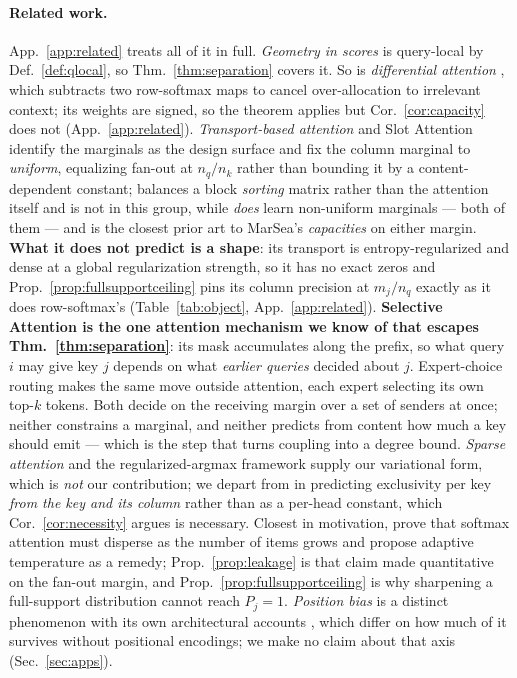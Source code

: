\documentclass{article}
\begin{document}
\paragraph{Related work.} App.~\ref{app:related} treats all of it in full. \emph{Geometry in
scores} \citep{hu2018relation,wu2021rethinking,gao2021fast,liu2022dab,hou2024relation} is
query-local by Def.~\ref{def:qlocal}, so Thm.~\ref{thm:separation} covers it. So is
\emph{differential attention} \citep{ye2024differential}, which subtracts two row-softmax maps to
cancel over-allocation to irrelevant context; its weights are signed, so the theorem applies but
Cor.~\ref{cor:capacity} does not (App.~\ref{app:related}).
\emph{Transport-based attention}
\citep{sander2022sinkformers,shahbazi2025lotformer} and Slot Attention
\citep{locatello2020slot} identify the marginals as the design surface and fix the column
marginal to \emph{uniform}, equalizing fan-out at $n_q/n_k$ rather than bounding it by a
content-dependent constant; \citet{tay2020sparse} balances a block \emph{sorting} matrix rather
than the attention itself and is not in this group, while \citet{zhang2023mesh} \emph{does}
learn non-uniform marginals --- both of them --- and is the closest prior art to MarSea's
\emph{capacities} on either margin. \textbf{What it does not predict is a shape}: its transport
is entropy-regularized and dense at a global regularization strength, so it has no exact zeros
and Prop.~\ref{prop:fullsupportceiling} pins its column precision at $m_j/n_q$ exactly as it does
row-softmax's (Table~\ref{tab:object}, App.~\ref{app:related}). \textbf{Selective Attention \citep{leviathan2024selective} is the one attention mechanism we know
of that escapes Thm.~\ref{thm:separation}}: its mask accumulates along the prefix, so what query
$i$ may give key $j$ depends on what \emph{earlier queries} decided about $j$. Expert-choice
routing \citep{zhou2022mixture} makes the same move outside attention, each expert selecting its
own top-$k$ tokens. Both decide on the receiving margin over a set of senders at once; neither
constrains a marginal, and neither predicts from content how much a key should emit --- which is
the step that turns coupling into a degree bound.
\emph{Sparse attention} \citep{martins2016softmax,peters2019sparse,correia2019adaptively} and the
regularized-argmax framework \citep{niculae2017regularized,blondel2019fenchel} supply our
variational form, which is \emph{not} our contribution; we depart from
\citet{correia2019adaptively} in predicting exclusivity per key \emph{from the key and its
column} rather than as a per-head constant, which Cor.~\ref{cor:necessity} argues is necessary.
Closest in motivation, \citet{velickovic2024softmax} prove that softmax attention must disperse
as the number of items grows and propose adaptive temperature as a remedy;
Prop.~\ref{prop:leakage} is that claim made quantitative on the fan-out margin, and
Prop.~\ref{prop:fullsupportceiling} is why sharpening a full-support distribution cannot reach
$P_j=1$. \emph{Position bias} \citep{liu2023lost} is a distinct phenomenon with its own architectural
accounts \citep{chowdhury2026birth,wu2025emergence,herasimchyk2026residual}, which differ on how
much of it survives without positional encodings; we make no claim about that axis
(Sec.~\ref{sec:apps}).
\end{document}
